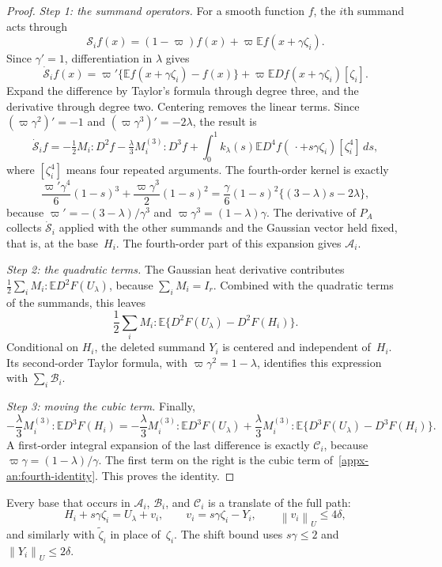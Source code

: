 \documentclass[11pt,letterpaper]{article}
\newif\ifshowrev
\newenvironment{revblock}{\ifshowrev\color{revblue}%
\hypersetup{linkcolor=revblue,citecolor=revblue,urlcolor=revblue}\fi}{}
\newif\ifshowpass
\newcommand{\ps}[1]{\ifshowpass{\color{revblue}#1}\else#1\fi}
\newif\ifshowskill
\newcommand{\sks}[1]{\ifshowskill{\color{revblue}#1}\else#1\fi}
\theoremstyle{remark}
\newcommand{\E}{\mathbb E}
\newcommand{\norm}[1]{\left\lVert#1\right\rVert}
\newcommand{\dd}{\,d}
\begin{document}
\begin{revblock}
\begin{proof}
\emph{Step 1: the summand operators.} For a smooth function \(f\), the
\(i\)th summand acts through
\[
 \ps{\mathcal S_i}f(x)=(1-\sks{\varpi})f(x)+\sks{\varpi}\E f(x+\gamma\zeta_i).
\]
Since \(\gamma'=1\), differentiation in \(\lambda\) gives
\[
 \ps{\dot{\mathcal S}_i}f(x)=\sks{\varpi}'\{\E f(x+\gamma\zeta_i)-f(x)\}
                  +\sks{\varpi}\E Df(x+\gamma\zeta_i)[\zeta_i].
\]
Expand the difference by Taylor's formula through degree three, and the
derivative through degree two. Centering removes the linear terms. Since
\((\sks{\varpi}\gamma^2)'=-1\) and \((\sks{\varpi}\gamma^3)'=-2\lambda\), the result is
\[
 \ps{\dot{\mathcal S}_i}f
 =-\tfrac12 M_i:D^2f
   -\tfrac\lambda3 \sks{M_i^{(3)}}:D^3f
   +\int_0^1k_\lambda(s)
        \E D^4f(\,\cdot+s\gamma\zeta_i)[\zeta_i^4]\dd s,
\]
where \([\zeta_i^4]\) means four repeated arguments. The fourth-order
kernel is exactly
\[
 \frac{\sks{\varpi}'\gamma^4}{6}(1-s)^3+\frac{\sks{\varpi}\gamma^3}{2}(1-s)^2
 =\frac\gamma6(1-s)^2\{(3-\lambda)s-2\lambda\},
\]
because \(\sks{\varpi}'=-(3-\lambda)/\gamma^3\) and \(\sks{\varpi}\gamma^3=(1-\lambda)\gamma\).
The derivative of \(P_A\) collects \(\ps{\dot{\mathcal S}_i}\) applied with the other
summands and the Gaussian vector held fixed, that is, at the base~\(H_i\).
The fourth-order part of this expansion gives \(\mathcal A_i\).

\emph{Step 2: the quadratic terms.} The Gaussian heat derivative
contributes \(\tfrac12\sum_iM_i:\E D^2F(U_\lambda)\), because
\(\sum_iM_i=I_r\). Combined with the quadratic terms of the summands, this leaves
\[
 \frac12\sum_i M_i:
             \E\{D^2F(U_\lambda)-D^2F(H_i)\}.
\]
Conditional on \(H_i\), the deleted summand \(Y_i\) is centered and
independent of~\(H_i\). Its second-order Taylor formula, with
\(\sks{\varpi}\gamma^2=1-\lambda\), identifies this expression with
\(\sum_i\mathcal B_i\).

\emph{Step 3: moving the cubic term.} Finally,
\[
 -\frac\lambda3 \sks{M_i^{(3)}}:\E D^3F(H_i)
 =-\frac\lambda3 \sks{M_i^{(3)}}:\E D^3F(U_\lambda)
   +\frac\lambda3 \sks{M_i^{(3)}}:
          \E\{D^3F(U_\lambda)-D^3F(H_i)\}.
\]
A first-order integral expansion of the last difference is exactly
\(\mathcal C_i\), because \(\sks{\varpi}\gamma=(1-\lambda)/\gamma\). The first term
on the right is the cubic term of~\eqref{appx-an:fourth-identity}. This
proves the identity.
\end{proof}

Every base that occurs in \(\mathcal A_i\), \(\mathcal B_i\), and
\(\mathcal C_i\) is a translate of the full path:
\begin{equation}
 H_i+s\gamma\zeta_i=U_\lambda+v_i,\qquad v_i=s\gamma\zeta_i-Y_i,
 \qquad \norm{v_i}_U\le4\delta,
 \label{appx-an:translates}
\end{equation}
and similarly with \(\widetilde\zeta_i\) in place of~\(\zeta_i\). The
shift bound uses \(s\gamma\le2\) and \(\norm{Y_i}_U\le2\delta\).


\end{revblock}
\end{document}
